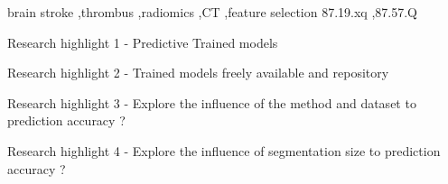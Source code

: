 \documentclass[preprint,12pt]{elsarticle}
\begin{document}
\begin{frontmatter}

\begin{abstract}

Background and Objectives
Methods
Results
Conclusions

\end{abstract}

\begin{graphicalabstract}
\end{graphicalabstract}

\begin{keyword}
brain stroke \sep thrombus \sep radiomics \sep CT \sep feature selection
87.19.xq \sep 87.57.Q

\end{keyword}

\begin{highlights} %
\item Research highlight 1 - Predictive Trained models
\item Research highlight 2 - Trained models freely available and repository
\item Research highlight 3 - Explore the influence of the method and dataset to prediction accuracy ?
\item Research highlight 4 - Explore the influence of segmentation size to prediction accuracy ?
\end{highlights}


\end{frontmatter}

\end{document}
